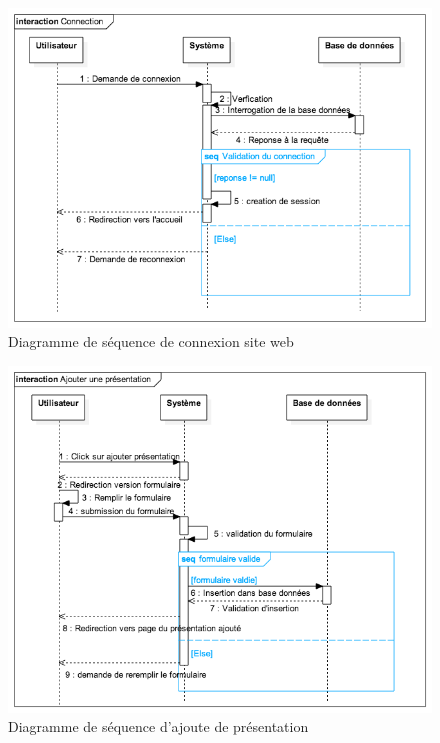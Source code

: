 \documentclass[12pt, ChapStyle1, oneside]{./Styles/Dea_Gsm}
\begin{document}
\begin{figure}[H]
    \centering
    \includegraphics[width=6in]{diagsequenceloginweb.png}
    \caption{Diagramme de séquence de connexion site web}
    \label{diagdeploit}
\end{figure}

\vspace{20cm}

\begin{figure}[H]
    \centering
    \includegraphics[width=6in]{diagsequenceajoutepres}
    \caption{Diagramme de séquence d'ajoute de présentation}
    \label{diagdeploit}
\end{figure}
\end{document}
